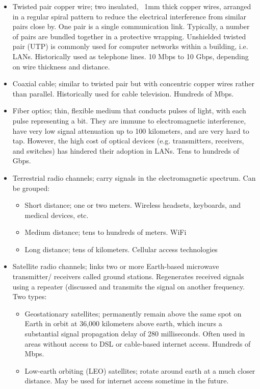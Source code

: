 \documentclass[8pt, table, xcdraw]{article}%
\begin{document}
\begin{itemize}
    \item Twisted pair copper wire; two insulated, ~1mm thick copper wires, arranged in a regular spiral pattern to reduce the electrical interference from similar pairs close by. One pair is a single communication link. Typically, a number of pairs are bundled together in a protective wrapping. Unshielded twisted pair (UTP) is commonly used for computer networks within a building, i.e. LANs. Historically used as telephone lines. 10 Mbps to 10 Gbps, depending on wire thickness and distance.
    \item Coaxial cable; similar to twisted pair but with concentric copper wires rather than parallel. Historically used for cable television. Hundreds of Mbps.
    \item Fiber optics;  thin, flexible medium that conducts pulses of light, with each pulse representing a bit. They are immune to electromagnetic interference, have very low signal attenuation up to 100 kilometers, and are very hard to tap. However, the high cost of optical devices (e.g. transmitters, receivers, and switches) has hindered their adoption in LANs. Tens to hundreds of Gbps.
    \item Terrestrial radio channels; carry signals in the electromagnetic spectrum. Can be grouped:
    \begin{itemize}
        \item Short distance; one or two meters. Wireless headsets, keyboards, and medical devices, etc.
        \item Medium distance; tens to hundreds of meters. WiFi
        \item Long distance; tens of kilometers.  Cellular access technologies
    \end{itemize}
    \item Satellite radio channels; links two or more Earth-based microwave transmitter/ receivers called ground stations. Regenerates received signals using a repeater (discussed and transmits the signal on another frequency. Two types:
    \begin{itemize}
        \item Geostationary satellites; permanently remain above the same spot on Earth in orbit at 36,000 kilometers above earth, which incurs a substantial signal propagation delay of 280 milliseconds. Often used in areas without access to DSL or cable-based internet access. Hundreds of Mbps.
        \item Low-earth orbiting (LEO) satellites; rotate around earth at a much closer distance. May be used for internet access sometime in the future.
    \end{itemize}
\end{itemize}
\end{document}
